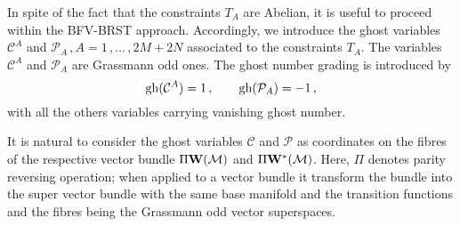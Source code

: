 \documentclass[a4paper,11pt]{amsart}
\numberwithin{thm}{section} %
\numberwithin{equation}{section} %
\numberwithin{figure}{section} %
\newcommand{\gh}[1]{{\rm gh}(#1)}
\renewcommand{\:}{{\rm\, :\,}}
\def\cP{{\mathcal P}}
\def\cc{{\mathcal C}}
\def\manM{{\mathcal M}}
\def\W{{\bf W}}
\begin{document}
In spite of the fact that the constraints $T_A$ are Abelian,
it is useful to proceed within the BFV-BRST approach.
Accordingly, we introduce the  ghost variables $\cc^A$ and
$\cP_A\,, A=1\,,\ldots\,,2M+2N$ associated to the constraints $T_A$.
The variables $\cc^A$ and $\cP_A$ are Grassmann odd ones.
The ghost number grading is introduced by
\begin{equation}
\gh{\cc^A}=1\,,\qquad \gh{\cP_A}=-1\,,
  \label{eq:ghost}
\end{equation}
with all the others variables carrying vanishing ghost
number.



It is natural to consider the ghost variables $\cc$ and $\cP$
as coordinates on the fibres of the respective vector bundle $\Pi\W(\manM)$
and $\Pi\W^*(\manM)$.  Here, $\Pi$ denotes parity
reversing operation; when applied to a vector bundle it transform the
bundle into the super vector bundle with the same base manifold and
the transition functions and the fibres being the Grassmann odd
vector superspaces.
\end{document}
